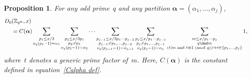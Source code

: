 \documentclass[12pt,reqno]{amsart}
\newtheorem{proposition}[theorem]{Proposition}
\theoremstyle{definition}
\newcommand{\Z}{{\mathbb Z}}
\newcommand{\balpha}{{\bm\alpha}}
\renewcommand{\mod}[1]{{\ifmmode\text{\rm\ (mod~$#1$)}\else\discretionary{}{}{\hbox{ }}\rm(mod~$#1$)\fi}}
\begin{document}
\begin{proposition} \label{initial D0 prop}
For any odd prime~$q$ and any partition $\balpha=(\alpha_1,\dots,\alpha_j)$,
\begin{align}
D_0 & (\Z_{q^\balpha},x) \label{D_0} \\
&= C(\balpha) \sum_{\substack{p_1\le x/3\\\nu_q(p_1-1)=\alpha_1}} \sum_{\substack{p_2\le x/3p_1\\p_2\ne p_1\\\nu_q(p_2-1)=\alpha_2}} \cdots \sum_{\substack{p_{j-1}\le x/3p_1\cdots p_{j-2} \\ p_{j-1}\ne p_1,\ldots,p_{j-2} \\ \nu_q(p_{j-1}-1)=\alpha_{j-1}}} \sum_{\substack{p_j\le x/p_1\cdots p_{j-1}\\p_j\ne p_1,\ldots,p_{j-1}\\\nu_q(p_j-1)=\alpha_j}} \sum_{\substack{m\le x/p_1\cdots p_j\\q\dnd m\\ (t\mid m \text{ and }t\equiv1\mod q)\Rightarrow t\in\{p_1,\dots,p_j\}}} 1, \notag
\end{align}
where~$t$ denotes a generic prime factor of~$m$. Here, $C(\balpha)$ is the constant defined in equation~\eqref{Calpha def}.
\end{proposition}
\end{document}
